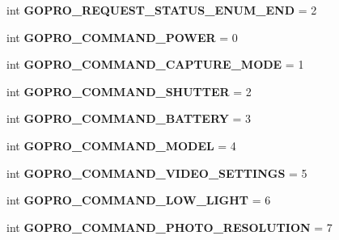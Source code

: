 \begin{DoxyCompactItemize}
int {\bfseries G\+O\+P\+R\+O\+\_\+\+R\+E\+Q\+U\+E\+S\+T\+\_\+\+S\+T\+A\+T\+U\+S\+\_\+\+E\+N\+U\+M\+\_\+\+E\+ND} = 2
\item 
\mbox{\label{namespacepymavlink_1_1dialects_1_1v10_ac2e0475fa58681e216a104c1e6aab08c}} 
int {\bfseries G\+O\+P\+R\+O\+\_\+\+C\+O\+M\+M\+A\+N\+D\+\_\+\+P\+O\+W\+ER} = 0
\item 
\mbox{\label{namespacepymavlink_1_1dialects_1_1v10_aead8dd9b473be2564b2371de2abb3e2a}} 
int {\bfseries G\+O\+P\+R\+O\+\_\+\+C\+O\+M\+M\+A\+N\+D\+\_\+\+C\+A\+P\+T\+U\+R\+E\+\_\+\+M\+O\+DE} = 1
\item 
\mbox{\label{namespacepymavlink_1_1dialects_1_1v10_a95f1aa2720bbc9d91bfb81a306a6f0eb}} 
int {\bfseries G\+O\+P\+R\+O\+\_\+\+C\+O\+M\+M\+A\+N\+D\+\_\+\+S\+H\+U\+T\+T\+ER} = 2
\item 
\mbox{\label{namespacepymavlink_1_1dialects_1_1v10_a6d67a67619657488aea50b55804cf5c8}} 
int {\bfseries G\+O\+P\+R\+O\+\_\+\+C\+O\+M\+M\+A\+N\+D\+\_\+\+B\+A\+T\+T\+E\+RY} = 3
\item 
\mbox{\label{namespacepymavlink_1_1dialects_1_1v10_a4ae81b934a205faa64193f5c455b3592}} 
int {\bfseries G\+O\+P\+R\+O\+\_\+\+C\+O\+M\+M\+A\+N\+D\+\_\+\+M\+O\+D\+EL} = 4
\item 
\mbox{\label{namespacepymavlink_1_1dialects_1_1v10_aa1b87c1b0ae52dc5e76432fb90f6db54}} 
int {\bfseries G\+O\+P\+R\+O\+\_\+\+C\+O\+M\+M\+A\+N\+D\+\_\+\+V\+I\+D\+E\+O\+\_\+\+S\+E\+T\+T\+I\+N\+GS} = 5
\item 
\mbox{\label{namespacepymavlink_1_1dialects_1_1v10_ae693b18155ce6329e1e0703c511bbc44}} 
int {\bfseries G\+O\+P\+R\+O\+\_\+\+C\+O\+M\+M\+A\+N\+D\+\_\+\+L\+O\+W\+\_\+\+L\+I\+G\+HT} = 6
\item 
\mbox{\label{namespacepymavlink_1_1dialects_1_1v10_adfbaea6a9e88ff0e4038c02f4a7e205e}} 
int {\bfseries G\+O\+P\+R\+O\+\_\+\+C\+O\+M\+M\+A\+N\+D\+\_\+\+P\+H\+O\+T\+O\+\_\+\+R\+E\+S\+O\+L\+U\+T\+I\+ON} = 7

\end{DoxyCompactItemize}
